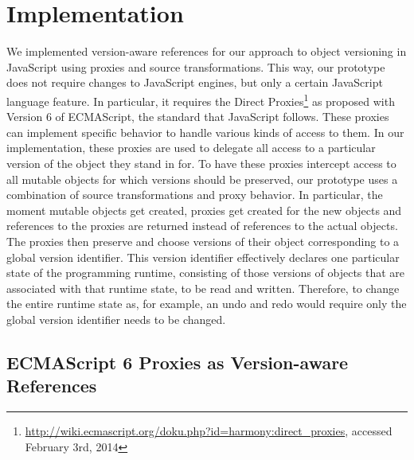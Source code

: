 \chapter{Implementation} \label{chapter:IMPLEMENTATION}

We implemented version-aware references for our approach to object versioning in JavaScript using proxies and source transformations.
This way, our prototype does not require changes to JavaScript engines, but only a certain JavaScript language feature.
In particular, it requires the Direct Proxies\footnote{\url{http://wiki.ecmascript.org/doku.php?id=harmony:direct_proxies}, accessed February 3rd, 2014} as proposed with Version 6 of ECMAScript, the standard that JavaScript follows.
These proxies can implement specific behavior to handle various kinds of access to them.
In our implementation, these proxies are used to delegate all access to a particular version of the object they stand in for.
To have these proxies intercept access to all mutable objects for which versions should be preserved, our prototype uses a combination of source transformations and proxy behavior.
In particular, the moment mutable objects get created, proxies get created for the new objects and references to the proxies are returned instead of references to the actual objects.
The proxies then preserve and choose versions of their object corresponding to a global version identifier.
This version identifier effectively declares one particular state of the programming runtime, consisting of those versions of objects that are associated with that runtime state, to be read and written.
Therefore, to change the entire runtime state as, for example, an undo and redo would require only the global version identifier needs to be changed.









\section{ECMAScript 6 Proxies as Version-aware References} \label{sec:IMPLEMENTATION:1}

